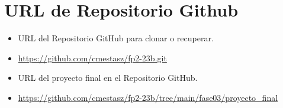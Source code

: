 \documentclass{article}
\begin{document}
\section{URL de Repositorio Github}
\begin{itemize}
	\item URL del Repositorio GitHub para clonar o recuperar.
	\item \url{https://github.com/cmestasz/fp2-23b.git}
	\item URL del proyecto final en el Repositorio GitHub.
	\item \url{https://github.com/cmestasz/fp2-23b/tree/main/fase03/proyecto_final}
\end{itemize}
\pagebreak
\end{document}
